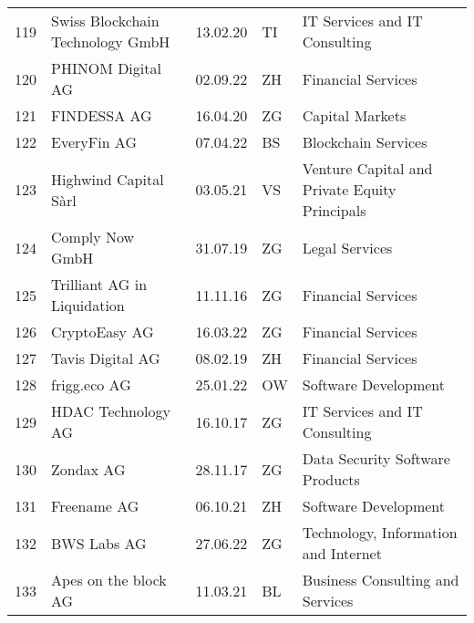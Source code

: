 \begin{tabular}{lllll}
119 &                   Swiss Blockchain Technology GmbH &      13.02.20 &     TI &                  IT Services and IT Consulting \\
120 &                                  PHINOM Digital AG &      02.09.22 &     ZH &                             Financial Services \\
121 &                                        FINDESSA AG &      16.04.20 &     ZG &                                Capital Markets \\
122 &                                        EveryFin AG &      07.04.22 &     BS &                            Blockchain Services \\
123 &                              Highwind Capital Sàrl &      03.05.21 &     VS &  Venture Capital and Private Equity Principals \\
124 &                                    Comply Now GmbH &      31.07.19 &     ZG &                                 Legal Services \\
125 &                        Trilliant AG in Liquidation &      11.11.16 &     ZG &                             Financial Services \\
126 &                                      CryptoEasy AG &      16.03.22 &     ZG &                             Financial Services \\
127 &                                   Tavis Digital AG &      08.02.19 &     ZH &                             Financial Services \\
128 &                                       frigg.eco AG &      25.01.22 &     OW &                           Software Development \\
129 &                                 HDAC Technology AG &      16.10.17 &     ZG &                  IT Services and IT Consulting \\
130 &                                          Zondax AG &      28.11.17 &     ZG &                Data Security Software Products \\
131 &                                        Freename AG &      06.10.21 &     ZH &                           Software Development \\
132 &                                        BWS Labs AG &      27.06.22 &     ZG &           Technology, Information and Internet \\
133 &                               Apes on the block AG &      11.03.21 &     BL &               Business Consulting and Services \\

\end{tabular}
